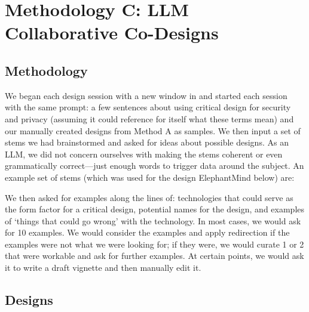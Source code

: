 
\section{Methodology C: LLM Collaborative Co-Designs}
\label{sec:meth3}

\subsection{Methodology}

We began each design session with a new window in \gpt and started each session with the same prompt: a few sentences about using critical design for security and privacy (assuming it could reference for itself what these terms mean) and our manually created designs from Method A as samples. We then input a set of stems we had brainstormed and asked for ideas about possible designs. As an LLM, we did not concern ourselves with making the stems coherent or even grammatically correct---just enough words to trigger data around the subject. An example set of stems (which was used for the design ElephantMind below) are:


We then asked for examples along the lines of: technologies that could serve as the form factor for a critical design, potential names for the design, and examples of `things that could go wrong' with the technology. In most cases, we would ask for 10 examples. We would consider the examples and apply redirection if the examples were not what we were looking for; if they were, we would curate 1 or 2 that were workable and ask for further examples. At certain points, we would ask it to write a draft vignette and then manually edit it.

\subsection{Designs}

